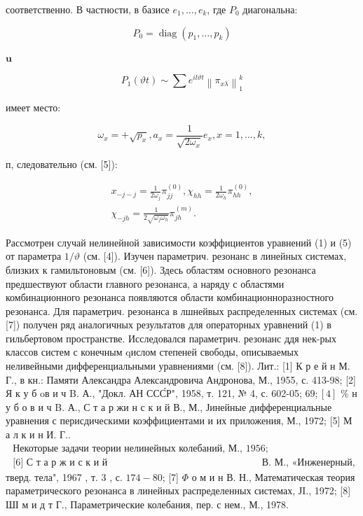 \documentclass[10pt]{article}
\begin{document}
соответственно. В частности, в базисе $e_{1}, \ldots, e_{k}$, где $P_{0}$ диагональна:

\[
P_{0}=\operatorname{diag}\left(p_{1}, \ldots, p_{k}\right)
\]

$\mathbf{u}$

\[
P_{1}(\vartheta t) \sim \sum e^{i l \vartheta t}\left\|\pi_{x \lambda}\right\|_{1}^{k}
\]

имеет место:

\[
\omega_{x}=+\sqrt{p_{x}}, a_{x}=\frac{1}{\sqrt{2 \omega_{x}}} e_{x}, x=1, \ldots, k,
\]

п, следовательно (см. [5]):

\[
\begin{gathered}
x_{-j-j}=\frac{1}{2 \omega_{j}} \pi_{j j}^{(0)}, \chi_{h h}=\frac{1}{2 \omega_{h}} \pi_{h h}^{(0)}, \\
\chi_{-j h}=\frac{1}{2 \sqrt{\omega_{j} \omega_{h}}} \pi_{j h}^{(m)} .
\end{gathered}
\]

Рассмотрен случай нелинейной зависимости коэффициентов уравнений (1) и (5) от параметра $1 / \vartheta$ (см. [4]). Изучен параметрич. резонанс в линейных системах, близких к гамильтоновым (см. [6]). Здесь областям основного резонанса предшествуют области главного резонанса, а наряду с областями комбинационного резонанса появляются области комбинационноразностного резонанса. Для параметрич. резонанса в лшнейвых распределенных системах (см. [7]) получен ряд аналогичных результатов для операторных уравнений (1) в гильбертовом пространстве. Исследовался параметрич. резонанс ддя нек-рых классов систем с конечным qислом степеней свободы, описываемых неливейными дифференциальными уравнениями (см. [8]). Лит.: [1] К р е й н М. Г., в кн.: Памяти Александра Александровича Андронова, М., 1955, с. 413-98; [2] Я к у б oв и ч B. А., "Докл. АН ССС́Р", 1958, т. 121, № 4, с. 602-05; $69 ;[4]$ \% н у б о в и ч B. А., С т а р жи н с к и й В., М., Јинейные дифференциальные уравнения с перисдическими коэффициентами и их приложения, М., 1972; [5] М а л к и н И. Г.. $\begin{array}{ll}\text { Некоторые задачи теории нелинейных колебаний, М., } 1956 \text {; } \\ \text { [6] С т а р ж и с к и й } & \text { В. М., «Инженерный, }\end{array}$ тверд. тела", 1967 , т. 3 , с. $174-80$; [7] $\Phi$ о м и н В. Н., Математическая теория параметрического резонанса в линейных распределенных системах, ЈI., 1972; [8] ШІ м и д т Г., Параметрические колебания, пер. с нем., М., 1978.
\end{document}
